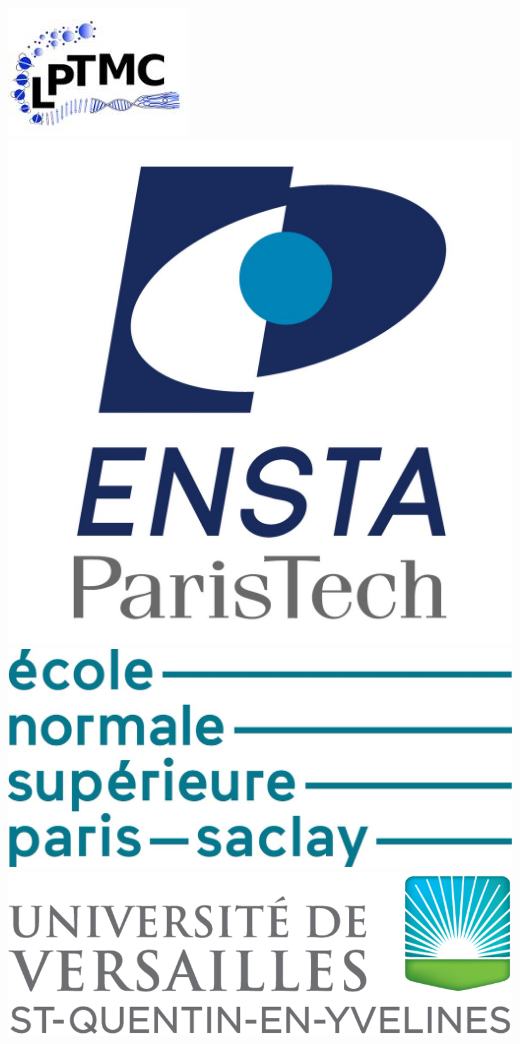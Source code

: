 \documentclass[10.5pt]{article}
\begin{document}
\begin{titlepage}
	

\vspace*{-22pt}
\begin{center}
\includegraphics[scale=0.45]{Logo_LPTMC.png}
\hspace*{20pt}
\includegraphics[scale=0.05]{Logo_ENSTA.jpg}
\hspace*{20pt}
\includegraphics[scale=0.10]{Logo_ENSC.jpg}
\hspace*{20pt}
\includegraphics[scale=0.15]{Logo_Versailles.png}
\\



\end{center}
\end{titlepage}
\end{document}
